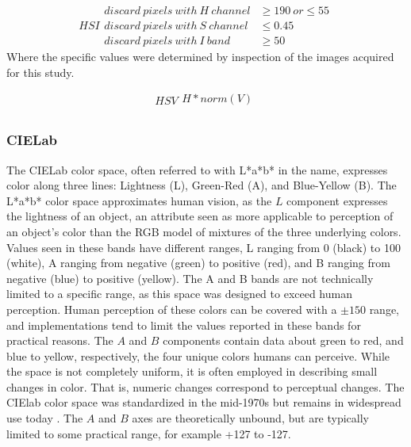 \documentclass[letterpaper, notitlepage]{report}
\begin{document}
{\begin{equation}\label{eqn:index-hsi}
	HSI
    \begin{split}
		discard~pixels~with~H~channel &\geq 190~or \leq 55\\
		discard~pixels~with~S~channel &\leq 0.45 \\
		discard~pixels~with~I~band &\geq 50
    \end{split}
\end{equation}
Where the specific values were determined by inspection of the images acquired for this study.

\begin{equation}\label{eqn:index-hsv}
	HSV
	\begin{split}
		H * norm(V) \\
	\end{split}
\end{equation}

\subsubsection{CIELab}
The CIELab color space, often referred to with L*a*b* in the name, expresses color along three lines: Lightness (L), Green-Red (A), and Blue-Yellow (B). The L*a*b* color space approximates human vision, as the $L$ component expresses  the lightness of an object, an attribute seen as more applicable to perception of an object's color than the RGB model of mixtures of the three underlying colors.  Values seen in these bands have different ranges, L ranging from 0 (black) to 100 (white), A ranging from negative (green) to positive (red), and B ranging from negative (blue) to positive (yellow). The A and B bands are not technically limited to a specific range, as this space was designed to exceed human perception. Human perception of these colors can be covered with a $\pm 150$ range, and implementations tend to limit the values reported in these bands for practical reasons.  The $A$ and $B$ components contain data about green to red, and blue to yellow, respectively, the four unique colors humans can perceive. While the space is not completely uniform, it is often employed in describing small changes in color. That is, numeric changes correspond to perceptual changes. The CIElab color space was standardized in the mid-1970s but remains in widespread use today \cite{Leilich2023-lf}.  The $A$ and $B$ axes are theoretically unbound, but are typically limited to some practical range, for example +127 to -127. 

}
\end{document}
